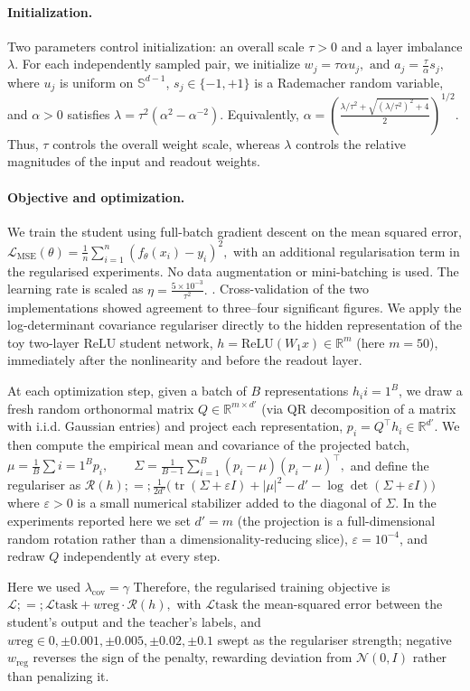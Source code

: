 \documentclass{article} %
\theoremstyle{remark}
\begin{document}
\paragraph{Initialization.}
Two parameters control initialization: an overall scale
\(\tau>0\) and a layer imbalance \(\lambda\).
For each independently sampled pair, we initialize $w_j=\tau\alpha u_j,
\text{ and }
a_j=\frac{\tau}{\alpha}s_j,$
where \(u_j\) is uniform on \(\mathbb{S}^{d-1}\),
\(s_j\in\{-1,+1\}\) is a Rademacher random variable, and
\(\alpha>0\) satisfies $\lambda
=
\tau^2\left(\alpha^2-\alpha^{-2}\right).$
Equivalently, $\alpha
=
\left(
\frac{\lambda/\tau^2+
\sqrt{(\lambda/\tau^2)^2+4}}{2}
\right)^{1/2}.
$
Thus, \(\tau\) controls the overall weight scale, whereas
\(\lambda\) controls the relative magnitudes of the input
and readout weights.


{\color{blue}
\paragraph{Objective and optimization.}
We train the student using full-batch gradient descent on
the mean squared error, $\mathcal{L}_{\mathrm{MSE}}(\theta)
=
\frac{1}{n}\sum_{i=1}^{n}
\left(f_\theta(x_i)-y_i\right)^2,$ with an additional regularisation term in the regularised
experiments. No data augmentation or mini-batching is used.
The learning rate is scaled as $\eta=\frac{5\times10^{-3}}{\tau^2}.$ . Cross-validation of the two implementations showed agreement to three--four significant figures. We apply the log-determinant covariance regulariser directly to the hidden representation of the toy two-layer ReLU student network, $h = \mathrm{ReLU}(W_1 x) \in \mathbb{R}^m$ (here $m=50$), immediately after the nonlinearity and before the readout layer.

At each optimization step, given a batch of $B$ representations ${h_i}{i=1}^{B}$, we draw a fresh random orthonormal matrix $Q \in \mathbb{R}^{m \times d'}$ (via QR decomposition of a matrix with i.i.d. Gaussian entries) and project each representation, $p_i = Q^\top h_i \in \mathbb{R}^{d'}$. We then compute the empirical mean and covariance of the projected batch,
$\mu = \frac{1}{B}\sum{i=1}^{B} p_i, \qquad
\Sigma = \frac{1}{B-1}\sum_{i=1}^{B} (p_i-\mu)(p_i-\mu)^\top,
$
and define the regulariser as
$ \mathcal{R}(h) ;=; \frac{1}{2d'}\Big(\operatorname{tr}(\Sigma+\varepsilon I) + |\mu|^2 - d' - \log\det(\Sigma+\varepsilon I)\Big)$
where $\varepsilon>0$ is a small numerical stabilizer added to the diagonal of $\Sigma$. In the experiments reported here we set $d'=m$ (the projection is a full-dimensional random rotation rather than a dimensionality-reducing slice), $\varepsilon=10^{-4}$, and redraw $Q$ independently at every step.

Here we used $\lambda_{\text{cov}}=\gamma$ 
Therefore, the regularised training objective is $\mathcal{L} ;=; \mathcal{L}{\text{task}} + w{\text{reg}}\cdot \mathcal{R}(h),
$ with $\mathcal{L}{\text{task}}$ the mean-squared error between the student's output and the teacher's labels, and $w{\text{reg}} \in {0,\pm0.001,\pm0.005,\pm0.02,\pm0.1}$ swept as the regulariser strength; negative $w_{\text{reg}}$ reverses the sign of the penalty, rewarding deviation from $\mathcal{N}(0,I)$ rather than penalizing it.
}
\end{document}
